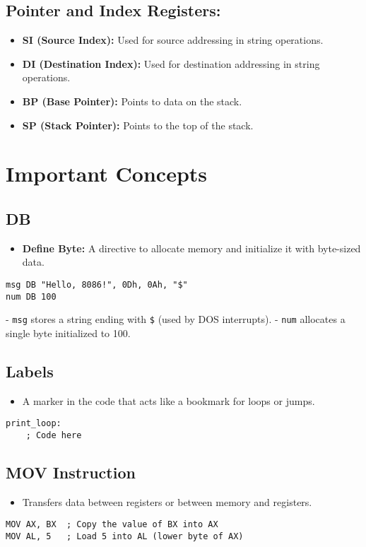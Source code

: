 \documentclass[a4paper,12pt]{article}
\begin{document}
\subsection*{Pointer and Index Registers:}
\begin{itemize}
    \item \textbf{SI (Source Index):} Used for source addressing in string operations.
    \item \textbf{DI (Destination Index):} Used for destination addressing in string operations.
    \item \textbf{BP (Base Pointer):} Points to data on the stack.
    \item \textbf{SP (Stack Pointer):} Points to the top of the stack.
\end{itemize}

\section*{Important Concepts}

\subsection*{DB}
\begin{itemize}
    \item \textbf{Define Byte:} A directive to allocate memory and initialize it with byte-sized data.
\end{itemize}
\begin{verbatim}
msg DB "Hello, 8086!", 0Dh, 0Ah, "$"
num DB 100
\end{verbatim}
- \texttt{msg} stores a string ending with \texttt{\$} (used by DOS interrupts).
- \texttt{num} allocates a single byte initialized to 100.

\subsection*{Labels}
\begin{itemize}
    \item A marker in the code that acts like a bookmark for loops or jumps.
\end{itemize}
\begin{verbatim}
print_loop:
    ; Code here
\end{verbatim}

\subsection*{MOV Instruction}
\begin{itemize}
    \item Transfers data between registers or between memory and registers.
\end{itemize}
\begin{verbatim}
MOV AX, BX  ; Copy the value of BX into AX
MOV AL, 5   ; Load 5 into AL (lower byte of AX)
\end{verbatim}
\end{document}

